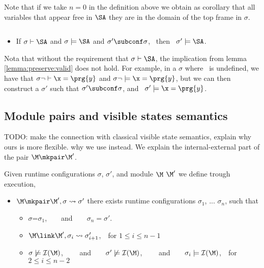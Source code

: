 Note that if we take $n=0$ in the definition above we obtain as corollary that   all variables that appear free in $\SA$ they  are in the domain of the top frame in $\sigma$.

\begin{lemma} $ $
\label{lemma:preserve:valid}
\begin{itemize}
\item
If  $\sigma \vdash \SA$ and $\sigma \models \SA$ and $\sigma' \subconf \sigma$, \  then  \ $\sigma' \models \SA$.
\end{itemize}
\end{lemma}

Nota that without the requirement  that $\sigma \vdash \SA$, the implication from lemma \ref{lemma:preserve:valid} does not hold. For example, in a $\sigma$ where \x\ is undefined, we have that $\sigma \neg\vdash \x = \prg{y}$ and 
$\sigma \neg\models \x = \prg{y}$, but we can then construct a $\sigma'$ such that $\sigma' \subconf \sigma$,  and
 \ $\sigma' \models \x = \prg{y}$.

\subsection{Module pairs and visible states semantics}

TODO: make the connection with classical visible state semantics, explain why ours is more flexible. why we use  instead. We explain the internal-external part of the pair $\M\mkpair\M'$.

 
\begin{definition}
Given runtime configurations $\sigma$,  $\sigma'$,  and module $\M$ $\M'$ we define  
\label{def:module_pair_execution} trough execution,
\begin{itemize}
\item
$\M \mkpair \M', \sigma \leadsto \sigma'$ \IFF  
there exists runtime configurations $\sigma_1$,  ...
$\sigma_n$, such that 
\begin{itemize}
\item
$\sigma$=$\sigma_1$,\ \  \ \ and\ \ \ \ $\sigma_n=\sigma'$.
\item
$\M \link \M', \sigma_i \leadsto \sigma_{i+1}'$,\  \  for $1\leq i \leq n\!-\!1$
\item
$\sigma \not\models {\mathcal I}({\M})$, \ \ \ \ and\ \ \ \  $\sigma' \not\models {\mathcal I}({\M})$, \ \ \ \ and\ \ \  \
$\sigma_i \models {\mathcal I}({\M})$,\ \ for $2\leq i \leq n\!-\!2$
\end{itemize}
\end{itemize}

\end{definition}

